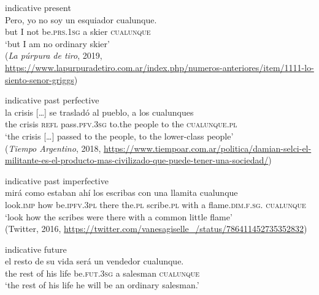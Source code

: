 \documentclass[output=paper,colorlinks,citecolor=brown]{langscibook}
\begin{document}
\begin{exe}[(102)]
\ex\label{ex:fk95}
    indicative present\\
    \gll Pero, yo no soy un esquiador cualunque.\\
    but I not be.\textsc{prs.1sg} a skier \textsc{cualunque}\\
    \glt ‘but I am no ordinary skier’\\
    (\textit{La púrpura de tiro}, 2019, \url{https://www.lapurpuradetiro.com.ar/index.php/numeros-anteriores/item/1111-lo-siento-senor-griggs})
    
    \ex \label{ex:fk96}
    indicative past perfective\\
    \gll la crisis […] se trasladó al pueblo, a los cualunques\\
    the crisis {} \textsc{refl} pass.\textsc{pfv.3sg} to.the people to the \textsc{cualunque}.\textsc{pl}\\
    \glt‘the crisis […] passed to the people, to the lower-class people’\\
    (\textit{Tiempo Argentino}, 2018, \url{https://www.tiempoar.com.ar/politica/damian-selci-el-militante-es-el-producto-mas-civilizado-que-puede-tener-una-sociedad/})

    \ex \label{ex:fk97}
    indicative past imperfective\\
    \gll mirá como estaban ahí los escribas con una llamita cualunque\\
    look.\textsc{imp} how be.\textsc{ipfv.3pl} there the.\textsc{pl} scribe.\textsc{pl} with a flame.\textsc{dim.f.sg.} \textsc{cualunque}\\
    \glt ‘look how the scribes were there with a common little flame’\\
    (Twitter, 2016, \url{https://twitter.com/vanesagiselle_/status/786411452735352832})
    
    \ex \label{ex:fk98}
    indicative future \citep[][82]{Asis2000}\\
    \gll el resto de su vida será un vendedor cualunque.\\
    the rest of his life be.\textsc{fut.3sg} a salesman \textsc{cualunque}\\
    \glt ‘the rest of his life he will be an ordinary salesman.’
    

\end{exe}
\end{document}
